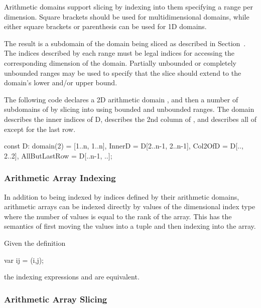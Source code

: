 Arithmetic domains support slicing by indexing into them specifying a
range per dimension.  Square brackets should be used for
multidimensional domains, while either square brackets or parenthesis
can be used for 1D domains.  

The result is a subdomain of the domain being sliced as described in
Section~.  The indices described by each range must
be legal indices for accessing the corresponding dimension of the
domain.  Partially unbounded or completely unbounded ranges may be
used to specify that the slice should extend to the domain's lower
and/or upper bound.

\begin{example}
The following code declares a 2D arithmetic domain , and then
a number of subdomains of  by slicing into  using
bounded and unbounded ranges.  The  domain describes the
inner indices of D,  describes the 2nd column of
, and  describes all of  except
for the last row.

\begin{chapel}
const D: domain(2) = [1..n, 1..n],
      InnerD = D[2..n-1, 2..n-1],
      Col2OfD = D[.., 2..2],
      AllButLastRow = D[..n-1, ..];
\end{chapel}
\end{example}


\subsubsection{Arithmetic Array Indexing}
\label{Arithmetic_Array_Indexing}

In addition to being indexed by indices defined by their arithmetic
domains, arithmetic arrays can be indexed directly by values of the
dimensional index type where the number of values is equal to the rank
of the array.  This has the semantics of first moving the values into
a tuple and then indexing into the array.

\begin{example}
Given the definition
\begin{chapel}
  var ij = (i,j);
\end{chapel}
the indexing expressions  and  are
equivalent.
\end{example}

\subsubsection{Arithmetic Array Slicing}
\label{Arithmetic_Array_Slicing}

